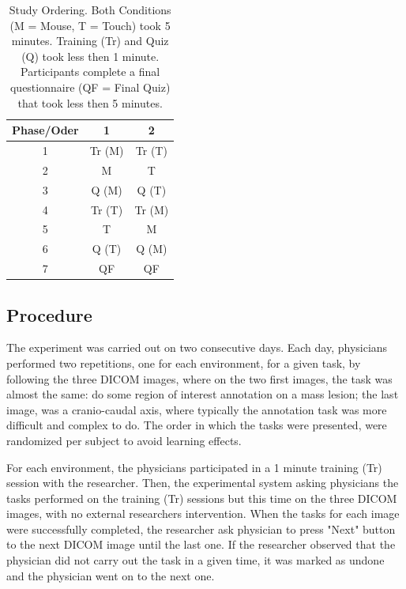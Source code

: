 \documentclass{sigchi}
\newcommand\tabhead[1]{\small\textbf{#1}}
\begin{document}
\begin{table}
  \centering
  \def\arraystretch{1.5}
  \begin{tabular}{|c|c|c|}
    \hline
    \tabhead{Phase/Oder} &
    \multicolumn{1}{|p{0.3\columnwidth}|}{\centering\tabhead{1}} &
    \multicolumn{1}{|p{0.3\columnwidth}|}{\centering\tabhead{2}} \\
    \hline
    1 & Tr (M) & Tr (T) \\
    \hline
    2 & M & T \\
    \hline
    3 & Q (M) & Q (T) \\
    \hline
    4 & Tr (T) & Tr (M) \\
    \hline
    5 & T & M \\
    \hline
    6 & Q (T) & Q (M) \\
    \hline
    7 & QF & QF \\
    \hline
  \end{tabular}
  \caption{Study Ordering. Both Conditions (M = Mouse, T = Touch) took 5 minutes. Training (Tr) and Quiz (Q) took less then 1 minute. Participants complete a final questionnaire (QF = Final Quiz) that took less then 5 minutes.}
  \label{study_ordering}
\end{table}

\subsection{Procedure}

The experiment was carried out on two consecutive days. Each day, physicians performed two repetitions, one for each environment, for a given task, by following the three DICOM images, where on the two first images, the task was almost the same: do some region of interest annotation on a mass lesion; the last image, was a  cranio-caudal axis, where typically the annotation task was more difficult and complex to do. The order in which the tasks were presented, were randomized per subject to avoid learning effects.

For each environment, the physicians participated in a 1 minute training (Tr) session with the researcher. Then, the experimental system asking physicians the tasks performed on the training (Tr) sessions but this time on the three DICOM images, with no external researchers intervention. When the tasks for each image were successfully completed, the researcher ask physician to press "Next" button to the next DICOM image until the last one. If the researcher observed that the physician did not carry out the task in a given time, it was marked as undone and the physician went on to the next one.
\end{document}
